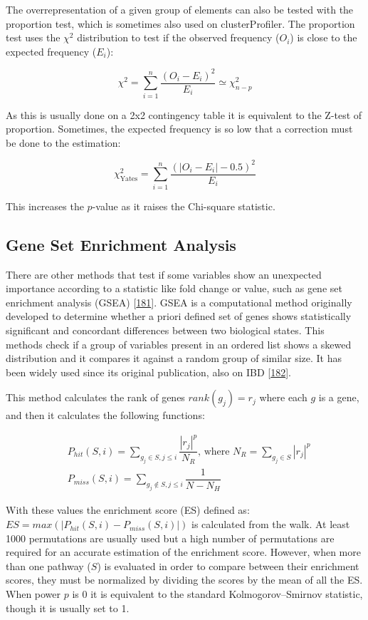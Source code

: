 \documentclass[
  a4paper,
]{book}
\begin{document}
The overrepresentation of a given group of elements can also be tested with the proportion test, which is sometimes also used on clusterProfiler.
The proportion test uses the \(\chi^2\) distribution to test if the observed frequency (\(O_i\)) is close to the expected frequency (\(E_i\)):

\[
\chi^2 = \sum_{i =1}^n \dfrac{(O_i - E_i)^2}{E_i} \simeq \chi_{n-p}^2
\]

As this is usually done on a 2x2 contingency table it is equivalent to the Z-test of proportion.
Sometimes, the expected frequency is so low that a correction must be done to the estimation:

\[
\chi_{\text{Yates}}^2 = \sum_{i =1}^n \dfrac{(|O_i - E_i | - 0.5)^2}{E_i}
\]

This increases the \(p\)-value as it raises the Chi-square statistic.

\hypertarget{gene-set-enrichment-analysis}{%
\subsection{Gene Set Enrichment Analysis}\label{gene-set-enrichment-analysis}}

There are other methods that test if some variables show an unexpected importance according to a statistic like fold change or value, such as gene set enrichment analysis (GSEA) {[}\protect\hyperlink{ref-subramanian2005}{181}{]}.
GSEA is a computational method originally developed to determine whether a priori defined set of genes shows statistically significant and concordant differences between two biological states.
This methods check if a group of variables present in an ordered list shows a skewed distribution and it compares it against a random group of similar size.
It has been widely used since its original publication, also on IBD {[}\protect\hyperlink{ref-protiva2016}{182}{]}.

This method calculates the rank of genes \(rank(g_j)=r_j\) where each \(g\) is a gene, and then it calculates the following functions:

\[
\begin{aligned}
& P_{hit}(S, i) = \sum_{g_j \in S, j \leq i}\dfrac{|r_j|^p}{N_R} \text{, where } N_R = \sum_{g_j \in S}|r_j|^p \\
& P_{miss}(S, i) = \sum_{g_j \not \in S, j \leq i}\dfrac{1}{N - N_H}
\end{aligned}
\]

With these values the enrichment score (ES) defined as: \(ES=max(|P_{hit}(S, i)-P_{miss}(S, i)\vert)\) is calculated from the walk.
At least 1000 permutations are usually used but a high number of permutations are required for an accurate estimation of the enrichment score.
However, when more than one pathway (\(S\)) is evaluated in order to compare between their enrichment scores, they must be normalized by dividing the scores by the mean of all the ES.
When power \(p\) is 0 it is equivalent to the standard Kolmogorov--Smirnov statistic, though it is usually set to 1.
\end{document}
